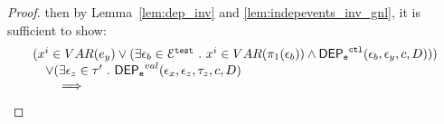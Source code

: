 \begin{proof}
then by Lemma~\ref{lem:dep_inv} and \ref{lem:indepevents_inv_gnl}, it is sufficient to show:
$$
\begin{array}{l}
(x^i \in VAR(\expr_y)\lor 
(\exists \event_b \in \eventset^{\test} \st x^i \in VAR(\pi_1(\event_b)) 
\land \eventdep^{\ctl}(\event_b, \event_y, c, D)))
\\ \quad 
\lor 
(\exists \event_z \in \trace' \st 
    \eventdep^{val}(\event_x, \event_z, \trace_z, c, D)
    \\ \qquad 
    \implies 

\end{array}$$
\end{proof}
